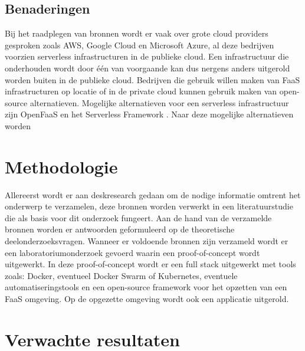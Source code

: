\subsection{Benaderingen}
Bij het raadplegen van bronnen wordt er vaak over grote cloud providers gesproken zoals AWS, Google Cloud en Microsoft Azure, al deze bedrijven voorzien serverless infrastructuren in de publieke cloud. Een infrastructuur die onderhouden wordt door één van voorgaande kan dus nergens anders uitgerold worden buiten in de publieke cloud. Bedrijven die gebruik willen maken van FaaS infrastructuren op locatie of in de private cloud kunnen gebruik maken van open-source alternatieven. Mogelijke alternatieven voor een serverless infrastructuur zijn OpenFaaS \autocite{Ellis2017} en het Serverless Framework \autocite{Serverless2018}. Naar deze mogelijke alternatieven worden



\section{Methodologie}
\label{sec:methodologie}

Allereerst wordt er aan deskresearch gedaan om de nodige informatie omtrent het onderwerp te verzamelen, deze bronnen worden verwerkt in een literatuurstudie die als basis voor dit onderzoek fungeert. Aan de hand van de verzamelde bronnen worden er antwoorden geformuleerd op de theoretische deelonderzoeksvragen. Wanneer er voldoende bronnen zijn verzameld wordt er een laboratoriumonderzoek gevoerd waarin een proof-of-concept wordt uitgewerkt. In deze proof-of-concept wordt er een full stack uitgewerkt met tools zoals: Docker, eventueel Docker Swarm of Kubernetes, eventuele automatiseringstools en een open-source framework voor het opzetten van een FaaS omgeving. Op de opgezette omgeving wordt ook een applicatie uitgerold.

\section{Verwachte resultaten}
\label{sec:verwachte_resultaten}

